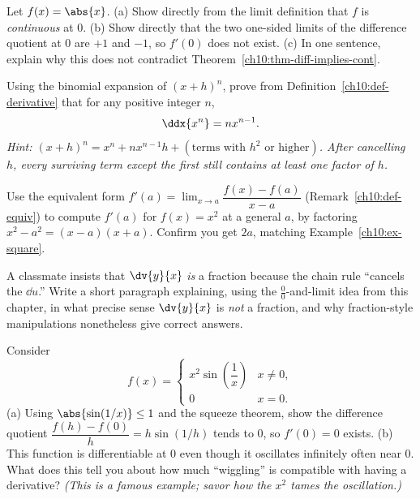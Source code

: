 \begin{exercise}
\label{ch10:ex-cont-not-diff}
Let $f(x) = \abs{x}$. (a) Show directly from the limit definition that $f$ is
\emph{continuous} at $0$. (b) Show directly that the two one-sided limits of the
difference quotient at $0$ are $+1$ and $-1$, so $f'(0)$ does not exist. (c) In one
sentence, explain why this does not contradict
Theorem~\ref{ch10:thm-diff-implies-cont}.
\end{exercise}

\begin{exercise}
\label{ch10:ex-prove-power}
Using the binomial expansion of $(x+h)^n$, prove from
Definition~\ref{ch10:def-derivative} that for any positive integer $n$,
\[
  \ddx{x^n} = n x^{n-1}.
\]
\emph{Hint: $(x+h)^n = x^n + nx^{n-1}h + (\text{terms with } h^2 \text{ or
higher})$. After cancelling $h$, every surviving term except the first still
contains at least one factor of $h$.}
\end{exercise}

\begin{exercise}
\label{ch10:ex-other-def}
Use the equivalent form $f'(a) = \displaystyle\lim_{x\to a}\dfrac{f(x)-f(a)}{x-a}$
(Remark~\ref{ch10:def-equiv}) to compute $f'(a)$ for $f(x) = x^2$ at a general
$a$, by factoring $x^2 - a^2 = (x-a)(x+a)$. Confirm you get $2a$, matching
Example~\ref{ch10:ex-square}.
\end{exercise}

\begin{exercise}
\label{ch10:ex-fraction}
A classmate insists that $\dv{y}{x}$ \emph{is} a fraction because the chain rule
``cancels the $\dd u$.'' Write a short paragraph explaining, using the
$\frac00$-and-limit idea from this chapter, in what precise sense $\dv{y}{x}$ is
\emph{not} a fraction, and why fraction-style manipulations nonetheless give
correct answers.
\end{exercise}

\begin{exercise}
\label{ch10:ex-subtle}
Consider
\[
  f(x) = \begin{cases} x^2 \sin\!\left(\dfrac{1}{x}\right) & x \neq 0,\\[4pt]
  0 & x = 0.\end{cases}
\]
(a) Using $\abs{\sin(1/x)} \le 1$ and the squeeze theorem, show the difference
quotient $\dfrac{f(h)-f(0)}{h} = h\sin(1/h)$ tends to $0$, so $f'(0) = 0$ exists.
(b) This function is differentiable at $0$ even though it oscillates infinitely
often near $0$. What does this tell you about how much ``wiggling'' is compatible
with having a derivative? \emph{(This is a famous example; savor how the $x^2$
tames the oscillation.)}
\end{exercise}
